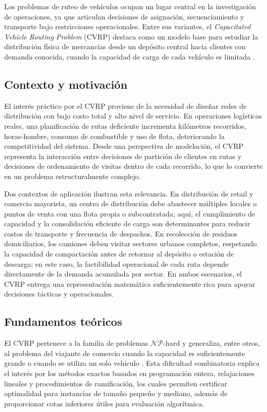 Los problemas de ruteo de vehículos ocupan un lugar central en la investigación de
operaciones, ya que articulan decisiones de asignación, secuenciamiento y transporte
bajo restricciones operacionales. Entre sus variantes, el \textit{Capacitated Vehicle
Routing Problem} (CVRP) destaca como un modelo base para estudiar la distribución
física de mercancías desde un depósito central hacia clientes con demanda conocida,
cuando la capacidad de carga de cada vehículo es limitada
\parencite{toth2002vehicle}.

\subsection{Contexto y motivación}

El interés práctico por el CVRP proviene de la necesidad de diseñar redes de
distribución con bajo costo total y alto nivel de servicio. En operaciones logísticas
reales, una planificación de rutas deficiente incrementa kilómetros recorridos,
horas-hombre, consumo de combustible y uso de flota, deteriorando la competitividad del
sistema. Desde una perspectiva de modelación, el CVRP representa la interacción entre
decisiones de partición de clientes en rutas y decisiones de ordenamiento de visitas
dentro de cada recorrido, lo que lo convierte en un problema estructuralmente complejo.

Dos contextos de aplicación ilustran esta relevancia. En distribución de retail y
comercio mayorista, un centro de distribución debe abastecer múltiples locales o puntos
de venta con una flota propia o subcontratada; aquí, el cumplimiento de capacidad y la
consolidación eficiente de carga son determinantes para reducir costos de transporte y
frecuencia de despachos. En recolección de residuos domiciliarios, los camiones deben
visitar sectores urbanos completos, respetando la capacidad de compactación antes de
retornar al depósito o estación de descarga; en este caso, la factibilidad operacional
de cada ruta depende directamente de la demanda acumulada por sector. En ambos
escenarios, el CVRP entrega una representación matemática suficientemente rica para
apoyar decisiones tácticas y operacionales.

\subsection{Fundamentos teóricos}

El CVRP pertenece a la familia de problemas $\mathcal{NP}$-hard y generaliza, entre
otros, al problema del viajante de comercio cuando la capacidad es suficientemente
grande o cuando se utiliza un solo vehículo \parencite{lenstra1981complexity}. Esta
dificultad combinatoria explica el interés por los métodos exactos basados en
programación entera, relajaciones lineales y procedimientos de ramificación, los cuales
permiten certificar optimalidad para instancias de tamaño pequeño y mediano, además de
proporcionar cotas inferiores útiles para evaluación algorítmica.

